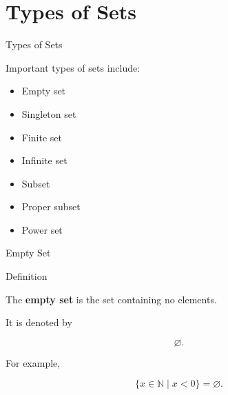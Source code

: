 \documentclass[aspectratio=169,11pt]{beamer}
\begin{document}
\section{Types of Sets}


\begin{frame}{Types of Sets}

Important types of sets include:

\begin{itemize}

\item Empty set

\item Singleton set

\item Finite set

\item Infinite set

\item Subset

\item Proper subset

\item Power set

\end{itemize}

\end{frame}


\begin{frame}{Empty Set}

\begin{block}{Definition}

The \textbf{empty set} is the set containing no elements.

\end{block}

\vspace{0.35cm}

It is denoted by

\[
\boxed{\varnothing}.
\]

\vspace{0.3cm}

For example,

\[
\{x\in\mathbb N\mid x<0\}
=
\varnothing.
\]

\end{frame}

\end{document}
